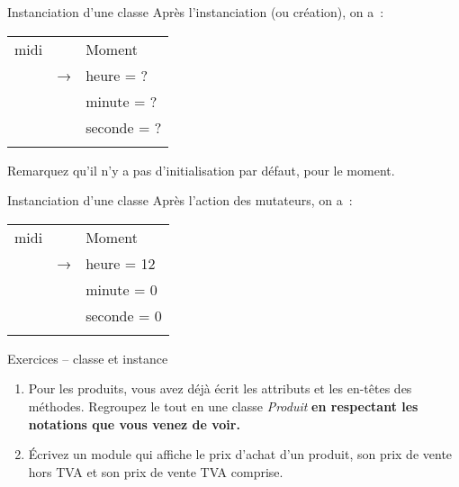 \begin{frame}{Instanciation d'une classe}
		Après l'instanciation (ou création), on a~:
		\begin{center}
		\begin{tabular}{m{2.578cm}m{2.261cm}|m{3.162cm}|}
		\centering  midi &
		\multicolumn{1}{m{2.261cm}}{~
		} &
		\multicolumn{1}{m{3.162cm}}{\centering\arraybslash
		 Moment}\\\hhline{-~-}
		\multicolumn{1}{|m{2.578cm}|}{~
		} &
		\centering \sffamily → &
		\centering\arraybslash  heure = ?\\\hhline{-~~}
		~
		 &
		~
		 &
		\centering\arraybslash  minute = ?\\
		~
		 &
		~
		 &
		\centering\arraybslash  seconde = ?\\\hhline{~~-}
		\end{tabular}
		\end{center}
		
		Remarquez qu'il n'y a pas d'initialisation par défaut, pour le moment.
\end{frame}

\begin{frame}{Instanciation d'une classe}
		Après l'action des mutateurs, on a~:
		\begin{center}
		\begin{tabular}{m{2.578cm}m{2.261cm}|m{3.162cm}|}
		\centering  midi &
		\multicolumn{1}{m{2.261cm}}{~
		} &
		\multicolumn{1}{m{3.162cm}}{\centering\arraybslash
		 Moment}\\\hhline{-~-}
		\multicolumn{1}{|m{2.578cm}|}{~
		} &
		\centering \sffamily → &
		\centering\arraybslash  heure = 12\\\hhline{-~~}
		~
		 &
		~
		 &
		\centering\arraybslash  minute = 0\\
		~
		 &
		~
		 &
		\centering\arraybslash  seconde = 0\\\hhline{~~-}
		\end{tabular}
		\end{center}
\end{frame}

\begin{frame}{Exercices – classe et instance}
	\begin{enumerate}
		\item 
			Pour les produits, vous avez déjà écrit les attributs et les en-têtes des
			méthodes. Regroupez le tout en une classe \textit{Produit}
			\textbf{en respectant les notations que vous venez de voir.}
		\item 
			Écrivez un module qui affiche le prix d'achat d'un produit, son prix 
			de vente hors TVA et son prix de vente TVA comprise.
	\end{enumerate}		
\end{frame}

